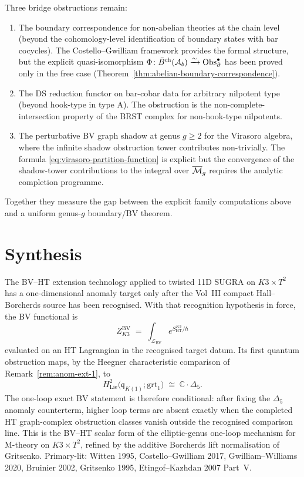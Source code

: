 \begin{remark}
Three bridge obstructions remain:
\begin{enumerate}
\item The boundary correspondence for non-abelian theories at the
 chain level (beyond the cohomology-level identification of boundary
 states with bar cocycles). The Costello--Gwilliam framework provides
 the formal structure, but the explicit quasi-isomorphism
 $\Phi \colon \bar{B}^{\mathrm{ch}}(\mathcal{A}_b) \xrightarrow{\sim} \operatorname{Obs}^\bullet_\partial$
 has been proved only in the free case
 (Theorem~\ref{thm:abelian-boundary-correspondence}).
\item The DS reduction functor on bar-cobar data for arbitrary nilpotent
 type (beyond hook-type in type A). The obstruction is the
 non-complete-intersection property of the BRST complex for
 non-hook-type nilpotents.
\item The perturbative BV graph shadow at genus $g \geq 2$ for the
Virasoro algebra, where the infinite shadow obstruction tower
contributes non-trivially.
 The formula \eqref{eq:virasoro-partition-function} is explicit but the
 convergence of the shadow-tower contributions to the integral over
 $\overline{\mathcal{M}}_g$ requires the analytic completion programme.
\end{enumerate}
Together they measure the gap between the explicit family computations
above and a uniform genus-$g$ boundary/BV theorem.
\end{remark}

\section{Synthesis}
\label{sec:bvht-ext-supplement}

\begin{remark}
\label{rem:bvht-ext-1}
The BV--HT extension technology applied to twisted 11D SUGRA on
$K3\times T^2$ has a one-dimensional anomaly target only after the
Vol~III compact Hall--Borcherds source has been recognised.  With that
recognition hypothesis in force, the BV functional is
\[
Z^{\mathrm{BV}}_{K3} \;=\;
\int_{\mathcal L_{\mathrm{BV}}} e^{S_{\mathrm{HT}}^{K3}/\hbar}
\]
evaluated on an HT Lagrangian in the recognised target datum.  Its
first quantum obstruction maps, by the Heegner characteristic comparison
of Remark~\ref{rem:anom-ext-1}, to
\[
H^2_{\mathrm{Lie}}\bigl(\mathfrak q_{K(1)};\mathrm{grt}_1\bigr)
\;\cong\; \mathbb C\cdot\Delta_5 .
\]
The one-loop exact BV statement is therefore conditional: after fixing
the $\Delta_5$ anomaly counterterm, higher loop terms are absent exactly
when the completed HT graph-complex obstruction classes vanish outside
the recognised comparison line.  This is the BV--HT scalar form of the
elliptic-genus one-loop mechanism for M-theory on $K3\times T^2$,
refined by the additive Borcherds lift normalisation of Gritsenko.
Primary-lit: Witten 1995, Costello--Gwilliam 2017,
Gwilliam--Williams 2020, Bruinier 2002, Gritsenko 1995,
Etingof--Kazhdan 2007 Part~V.
\end{remark}
